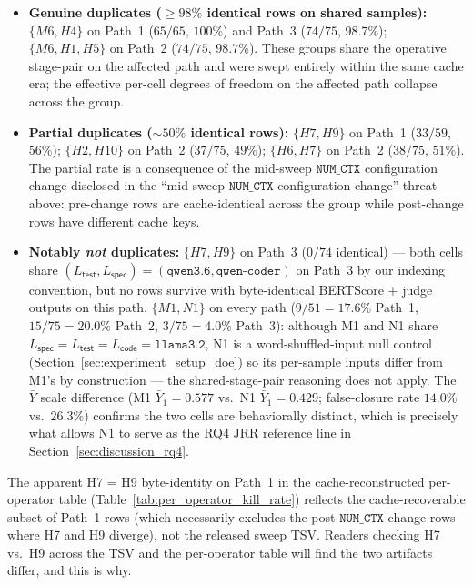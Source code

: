 \begin{itemize}
  \item \textbf{Genuine duplicates ($\geq 98\%$ identical rows on shared samples):}
    $\{M6, H4\}$ on Path~1 ($65/65$, $100\%$) and Path~3 ($74/75$, $98.7\%$);
    $\{M6, H1, H5\}$ on Path~2 ($74/75$, $98.7\%$).
    These groups share the operative stage-pair on the affected path and were swept entirely within the same cache era; the effective per-cell degrees of freedom on the affected path collapse across the group.
  \item \textbf{Partial duplicates ($\sim$$50\%$ identical rows):}
    $\{H7, H9\}$ on Path~1 ($33/59$, $56\%$);
    $\{H2, H10\}$ on Path~2 ($37/75$, $49\%$);
    $\{H6, H7\}$ on Path~2 ($38/75$, $51\%$).
    The partial rate is a consequence of the mid-sweep $\texttt{NUM\_CTX}$ configuration change disclosed in the ``mid-sweep $\texttt{NUM\_CTX}$ configuration change'' threat above: pre-change rows are cache-identical across the group while post-change rows have different cache keys.
  \item \textbf{Notably \emph{not} duplicates:}
    $\{H7, H9\}$ on Path~3 ($0/74$ identical) --- both cells share $(L_{\textsf{test}}, L_{\textsf{spec}}) = (\texttt{qwen3.6}, \texttt{qwen-coder})$ on Path~3 by our indexing convention, but no rows survive with byte-identical BERTScore + judge outputs on this path.
    $\{M1, N1\}$ on every path ($9/51 = 17.6\%$ Path~1, $15/75 = 20.0\%$ Path~2, $3/75 = 4.0\%$ Path~3): although M1 and N1 share $L_{\textsf{spec}} = L_{\textsf{test}} = L_{\textsf{code}} = \texttt{llama3.2}$, N1 is a word-shuffled-input null control (Section~\ref{sec:experiment_setup_doe}) so its per-sample inputs differ from M1's by construction --- the shared-stage-pair reasoning does not apply. The $\bar{Y}$ scale difference (M1 $\bar{Y}_1 = 0.577$ vs.\ N1 $\bar{Y}_1 = 0.429$; false-closure rate $14.0\%$ vs.\ $26.3\%$) confirms the two cells are behaviorally distinct, which is precisely what allows N1 to serve as the RQ4 JRR reference line in Section~\ref{sec:discussion_rq4}.
\end{itemize}

The apparent H7 = H9 byte-identity on Path~1 in the cache-reconstructed per-operator table (Table~\ref{tab:per_operator_kill_rate}) reflects the cache-recoverable subset of Path~1 rows (which necessarily excludes the post-$\texttt{NUM\_CTX}$-change rows where H7 and H9 diverge), not the released sweep TSV. Readers checking H7 vs.\ H9 across the TSV and the per-operator table will find the two artifacts differ, and this is why.

